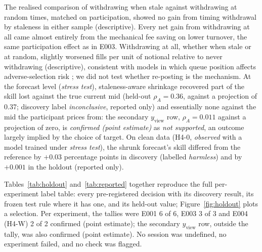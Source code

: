 \documentclass[11pt]{article}
\makeatletter
\newcommand{\status}[1]{\textit{#1}}
\newcommand{\obs}{\status{observed}}
\newcommand{\stress}{\status{stress test}}
\renewcommand\section{\@startsection{section}{1}{\z@}{-3.25ex\@plus -1ex \@minus -.2ex}{1.5ex \@plus .2ex}{\normalfont\large\bfseries}}
\makeatother
\begin{document}
The realised comparison of withdrawing when stale against withdrawing at random times, matched on participation, showed
no gain from timing withdrawal by staleness in either sample (descriptive). Every net gain from withdrawing at all came
almost entirely from the mechanical fee saving on lower turnover, the same participation effect as in E003. Withdrawing
at all, whether when stale or at random, slightly worsened fills per unit of notional relative to never withdrawing
(descriptive), consistent with models in which queue position affects adverse-selection risk
\citep{moallemi2017,garriott2025}; we did not test whether re-posting is the mechanism. At the forecast level
(\stress), staleness-aware shrinkage recovered part of the skill lost against the true current mid (held-out
$\rho_A=0.36$, against a projection of 0.37; discovery label \emph{inconclusive}, reported only) and essentially none
against the mid the participant prices from: the secondary $y_\mathrm{view}$ row, $\rho_A=0.011$ against a projection of
zero, is \emph{confirmed (point estimate)} as \emph{not supported}, an outcome largely implied by the choice of target. On
clean data (H4-0, \obs{} with a model trained under \stress), the shrunk forecast's skill differed from the reference by $+0.03$ percentage points in discovery (labelled
\emph{harmless}) and by $+0.001$ in the holdout (reported only).

\section{The held-out evaluation}\label{sec:holdout}

Tables~\ref{tab:holdout} and~\ref{tab:reported} together reproduce the full per-experiment label table: every
pre-registered decision with its discovery result, its frozen test rule where it has one, and its held-out value;
Figure~\ref{fig:holdout} plots a selection. Per experiment,
the tallies were E001 6 of 6, E003 3 of 3 and E004 (H4-W) 2 of 2 confirmed (point estimate); the secondary
$y_\mathrm{view}$ row, outside the tally, was also confirmed (point estimate). No session was undefined, no experiment
failed, and no check was flagged.
\end{document}
